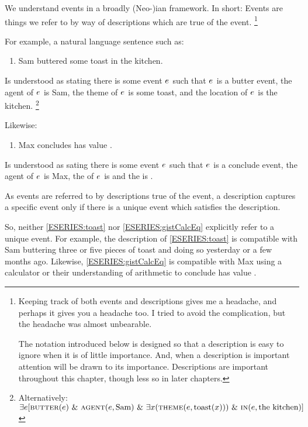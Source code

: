 \begin{note}
  We understand events in a broadly (Neo-)\citeauthor{Davidson:1967aa}ian framework.
  In short:
  Events are things we refer to by way of descriptions which are true of the event.%
  \footnote{
    Keeping track of both events and descriptions gives me a headache, and perhaps it gives you a headache too.
    I tried to avoid the complication, but the headache was almost unbearable.

    The notation introduced below is designed so that a description is easy to ignore when it is of little importance.
    And, when a description is important attention will be drawn to its importance.
    Descriptions are important throughout this chapter, though less so in later chapters.
  }

  For example, a natural language sentence such as:
  \begin{enumerate}[label=\arabic*., ref=(\arabic*), series=ESERIES]
  \item
    \label{ESERIES:toast}
    Sam buttered some toast in the kitchen.
  \end{enumerate}
  Is understood as stating there is some event \(e\sb{}\) such that \(e\sb{}\) is a butter event, the agent of \(e\sb{}\) is Sam, the theme of \(e\sb{}\) is some toast, and the location of \(e\sb{}\) is the kitchen.%
  \footnote{
    Alternatively:
    \(\exists e [\textsc{butter}(e)\text{ \& }\textsc{agent}(e, \text{Sam})\text{ \& }\exists x(\textsc{theme}(e, \text{toast}(x)))\text{ \& }\textsc{in}(e, \text{the kitchen})]\)
  }

  Likewise:
  \begin{enumerate}[label=\arabic*., ref=(\arabic*), resume*=ESERIES]
  \item
    \label{ESERIES:gistCalcEq}
    Max concludes \gistCalcEq{} has value .
  \end{enumerate}
  Is understood as sating there is some event \(e\sb{}\) such that \(e\sb{}\) is a conclude event, the agent of \(e\sb{}\) is Max, the  of \(e\sb{}\) is \gistCalcEq{} and the \val{} is .

  As events are referred to by descriptions true of the event, a description captures a specific event only if there is a unique event which satisfies the description.

  So, neither \ref{ESERIES:toast} nor \ref{ESERIES:gistCalcEq} explicitly refer to a unique event.
  For example, the description of \ref{ESERIES:toast} is compatible with Sam buttering three or five pieces of toast and doing so yesterday or a few months ago.
  Likewise, \ref{ESERIES:gistCalcEq} is compatible with Max using a calculator or their understanding of arithmetic to conclude \gistCalcEq{} has value .


\end{note}
